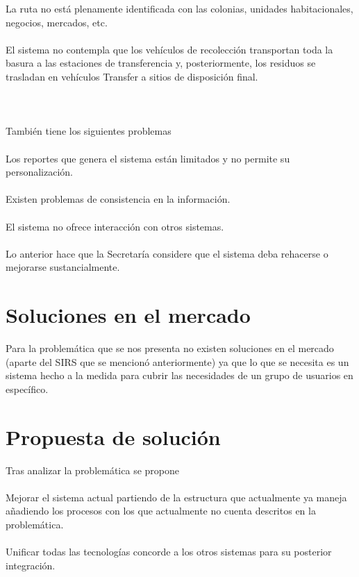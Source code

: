 \textbullet La ruta no está plenamente identificada con las colonias, unidades habitacionales, negocios, mercados, etc.\\\\

\textbullet El sistema no contempla que los vehículos de recolección transportan toda la basura a las estaciones de transferencia y, posteriormente, los residuos se trasladan en vehículos Transfer a sitios de disposición final.\\\\\\\\
También tiene los siguientes problemas \\\\

\textbullet Los reportes que genera el sistema están limitados y no permite su personalización.\\\\

\textbullet Existen problemas de consistencia en la información.\\\\

\textbullet El sistema no ofrece interacción con otros sistemas.\\\\

\textbullet Lo anterior hace que la Secretaría considere que el sistema deba rehacerse o mejorarse sustancialmente.\\

\section{Soluciones en el mercado}
Para la problemática que se nos presenta no existen soluciones en el mercado (aparte del SIRS que se mencionó anteriormente) ya que lo que se necesita es un sistema hecho a la medida para cubrir las necesidades de un grupo de usuarios en específico.


\section{Propuesta de solución}
Tras analizar la problemática se propone\\\\
\textbullet Mejorar el sistema actual partiendo de la estructura que actualmente ya maneja añadiendo los procesos con los que actualmente no cuenta descritos en la problemática.\\\\
\textbullet Unificar todas las tecnologías concorde a los otros sistemas para su posterior integración.


